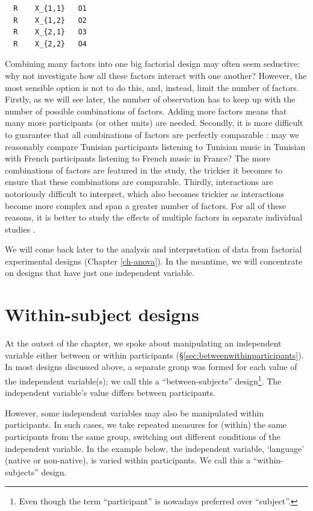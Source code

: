 \documentclass[
]{book}
\begin{document}
\begin{verbatim}
  R    X_{1,1}   O1
  R    X_{1,2}   O2
  R    X_{2,1}   O3
  R    X_{2,2}   O4
\end{verbatim}

Combining many factors into one big factorial design may often seem seductive: why not investigate how all these factors interact with one another? However, the most sensible option is not to do this, and, instead, limit the number of factors. Firstly, as we will see later, the number of observation has to keep up with the number of possible combinations of factors. Adding more factors means that many more participants (or other units) are needed. Secondly, it is more difficult to guarantee that all combinations of factors are perfectly comparable \citep[p.266]{SCC02}: may we reasonably compare Tunisian participants listening to Tunisian music in Tunisian with French participants listening to French music in France? The more combinations of factors are featured in the study, the trickier it becomes to ensure that these combinations are comparable. Thirdly, interactions are notoriously difficult to interpret, which also becomes trickier as interactions become more complex and span a greater number of factors. For all of these reasons, it is better to study the effects of multiple factors in separate individual studies \citep{Quene10}.

We will come back later to the analysis and interpretation of data from factorial experimental designs (Chapter \ref{ch-anova}).
In the meantime, we will concentrate on designs that have just one independent variable.

\hypertarget{sec:within-subject-designs}{%
\section{Within-subject designs}\label{sec:within-subject-designs}}

At the outset of the chapter, we spoke about manipulating an independent variable either between or within participants (§\ref{sec:betweenwithinparticipants}). In most designs discussed above, a separate group was formed for each value of the independent variable(s); we call this a ``between-subjects'' design\footnote{Even though the term ``participant'' is nowadays preferred over ``subject''.}. The independent variable's value differs between participants.

However, some independent variables may also be manipulated within participants. In such cases, we take repeated measures for (within) the same participants from the same group, switching out different conditions of the independent variable. In the example below, the independent variable, `language' (native or non-native), is varied within participants. We call this a ``within-subjects'' design.
\end{document}
